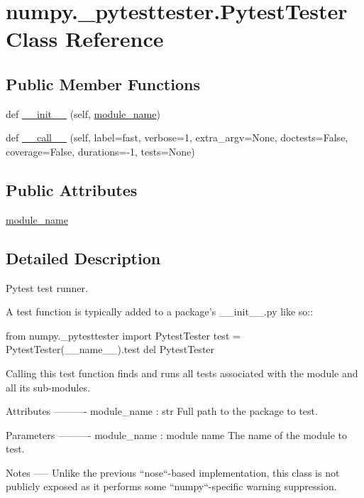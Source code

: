 \hypertarget{classnumpy_1_1__pytesttester_1_1PytestTester}{}\section{numpy.\+\_\+pytesttester.\+Pytest\+Tester Class Reference}
\label{classnumpy_1_1__pytesttester_1_1PytestTester}
\subsection*{Public Member Functions}
\begin{DoxyCompactItemize}
\item 
def \hyperlink{classnumpy_1_1__pytesttester_1_1PytestTester_a9677aafdac997589d919964a147a866c}{\+\_\+\+\_\+init\+\_\+\+\_\+} (self, \hyperlink{classnumpy_1_1__pytesttester_1_1PytestTester_a14050be50b2f2667302ef39c0dae5b36}{module\+\_\+name})
\item 
def \hyperlink{classnumpy_1_1__pytesttester_1_1PytestTester_aef0991a83a1fc748a0a651b68615d62b}{\+\_\+\+\_\+call\+\_\+\+\_\+} (self, label=\textquotesingle{}fast\textquotesingle{}, verbose=1, extra\+\_\+argv=None, doctests=False, coverage=False, durations=-\/1, tests=None)
\end{DoxyCompactItemize}
\subsection*{Public Attributes}
\begin{DoxyCompactItemize}
\item 
\hyperlink{classnumpy_1_1__pytesttester_1_1PytestTester_a14050be50b2f2667302ef39c0dae5b36}{module\+\_\+name}
\end{DoxyCompactItemize}


\subsection{Detailed Description}
\begin{DoxyVerb}Pytest test runner.

A test function is typically added to a package's __init__.py like so::

  from numpy._pytesttester import PytestTester
  test = PytestTester(__name__).test
  del PytestTester

Calling this test function finds and runs all tests associated with the
module and all its sub-modules.

Attributes
----------
module_name : str
    Full path to the package to test.

Parameters
----------
module_name : module name
    The name of the module to test.

Notes
-----
Unlike the previous ``nose``-based implementation, this class is not
publicly exposed as it performs some ``numpy``-specific warning
suppression.\end{DoxyVerb}
 

